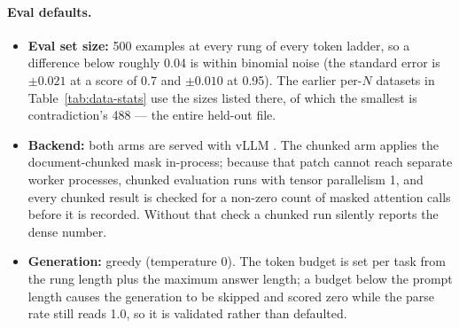 \paragraph{Eval defaults.}
\begin{claudeblock}
\begin{itemize}
\item \textbf{Eval set size:} 500 examples at every rung of every token ladder, so a difference
below roughly 0.04 is within binomial noise (the standard error is $\pm0.021$ at a score of 0.7 and
$\pm0.010$ at 0.95). The earlier per-$N$ datasets in Table~\ref{tab:data-stats} use the sizes
listed there, of which the smallest is contradiction's 488 --- the entire held-out file.
\item \textbf{Backend:} both arms are served with vLLM \cite{kwon2023efficient}. The chunked arm
applies the document-chunked mask in-process; because that patch cannot reach separate worker
processes, chunked evaluation runs with tensor parallelism 1, and every chunked result is
checked for a non-zero count of masked attention calls before it is recorded. Without that check
a chunked run silently reports the dense number.
\item \textbf{Generation:} greedy (temperature 0). The token budget is set per task from the
rung length plus the maximum answer length; a budget below the prompt length causes the
generation to be skipped and scored zero while the parse rate still reads 1.0, so it is
validated rather than defaulted.
\end{itemize}
\end{claudeblock}

